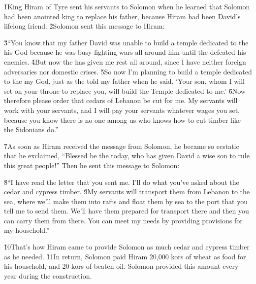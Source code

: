 \v{1}King Hiram of Tyre sent his servants to Solomon when he learned that Solomon had been anointed king to replace his father, because Hiram had been David's lifelong friend. \v{2}Solomon sent this message to Hiram:

\begin{poetry}
\poeml \v{3}``You know that my father David was unable to build a temple dedicated to the  his God because he was busy fighting wars all around him until the  defeated his enemies. \v{4}But now the  has given me rest all around, since I have neither foreign adversaries nor domestic crises. \v{5}So now I'm planning to build a temple dedicated to the  my God, just as the  told my father when he said, `Your son, whom I will set on your throne to replace you, will build the Temple dedicated to me.' \v{6}Now therefore please order that cedars of Lebanon be cut for me. My servants will work with your servants, and I will pay your servants whatever wages you set, because you know there is no one among us who knows how to cut timber like the Sidonians do.''
\end{poetry}

\v{7}As soon as Hiram received the message from Solomon, he became so ecstatic that he exclaimed, ``Blessed be the  today, who has given David a wise son to rule this great people!'' Then he sent this message to Solomon:

\begin{poetry}
\poeml \v{8}``I have read the letter that you sent me. I'll do what you've asked about the cedar and cypress timber. \v{9}My servants will transport them from Lebanon to the sea, where we'll make them into rafts and float them by sea to the port that you tell me to send them. We'll have them prepared for transport there and then you can carry them from there. You can meet my needs by providing provisions for my household.''
\end{poetry}

\v{10}That's how Hiram came to provide Solomon as much cedar and cypress timber as he needed. \v{11}In return, Solomon paid Hiram 20,000 kors of wheat as food for his household, and 20 kors of beaten oil. Solomon provided this amount every year during the construction.


